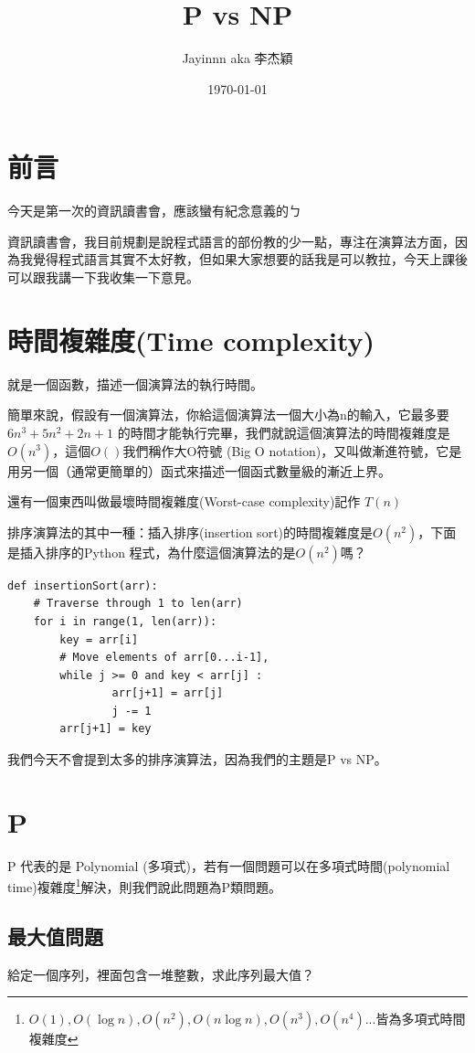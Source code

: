 \documentclass{article}
\title{P vs NP}
\author{Jayinnn aka 李杰穎}
\date{\today} %
\begin{document}
\maketitle
\section{前言}

今天是第一次的資訊讀書會，應該蠻有紀念意義的ㄅ

資訊讀書會，我目前規劃是說程式語言的部份教的少一點，專注在演算法方面，因為我覺得程式語言其實不太好教，但如果大家想要的話我是可以教拉，今天上課後可以跟我講一下我收集一下意見。

\section{時間複雜度(Time complexity)}
就是一個函數，描述一個演算法的執行時間。

簡單來說，假設有一個演算法，你給這個演算法一個大小為n的輸入，它最多要 $6n^3+5n^2+2n+1$ 的時間才能執行完畢，我們就說這個演算法的時間複雜度是$O(n^3)$，這個$O()$我們稱作大O符號 (Big O notation)，又叫做漸進符號，它是用另一個（通常更簡單的）函式來描述一個函式數量級的漸近上界。

還有一個東西叫做最壞時間複雜度(Worst-case complexity)記作 $T(n)$

排序演算法的其中一種：插入排序(insertion sort)的時間複雜度是$O(n^2)$，下面是插入排序的Python 程式，為什麼這個演算法的是$O(n^2)$嗎？

\begin{verbatim}
def insertionSort(arr):   
    # Traverse through 1 to len(arr)
    for i in range(1, len(arr)):   
        key = arr[i]   
        # Move elements of arr[0...i-1],        
        while j >= 0 and key < arr[j] : 
                arr[j+1] = arr[j] 
                j -= 1
        arr[j+1] = key 
\end{verbatim}

我們今天不會提到太多的排序演算法，因為我們的主題是P vs NP。

\section{P}
P 代表的是 Polynomial (多項式)，若有一個問題可以在多項式時間(polynomial time)複雜度\footnote{$O(1), O(\log n), O(n^2), O(n \log n), O(n^3), O(n^4)$...皆為多項式時間複雜度}解決，則我們說此問題為P類問題。

\subsection{最大值問題}
給定一個序列，裡面包含一堆整數，求此序列最大值？
\end{document}
